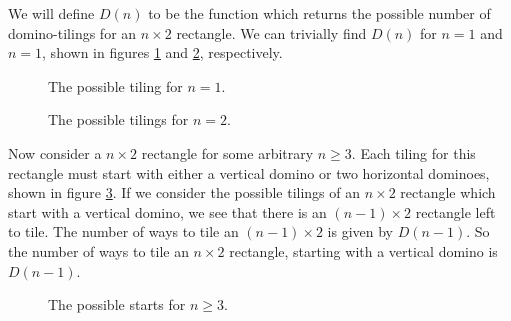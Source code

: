 \documentclass[12pt]{article}
\begin{document}
We will define $D(n)$ to be the function which returns the possible number of domino-tilings for an $n \times 2$ rectangle. We can trivially find $D(n)$ for $n=1$ and $n=1$, shown in figures \ref{fig:dom1} and \ref{fig:dom2}, respectively.

\begin{figure}[ht]
    \centering
    \caption{The possible tiling for $n=1$.}
    \label{fig:dom1}
\end{figure}

\begin{figure}[ht]
    \centering
    \caption{The possible tilings for $n=2$.}
    \label{fig:dom2}
\end{figure}

Now consider a $n\times 2$ rectangle for some arbitrary $n\geq 3$. Each tiling for this rectangle must start with either a vertical domino or two horizontal dominoes, shown in figure \ref{fig:domn}. If we consider the possible tilings of an $n\times 2$ rectangle which start with a vertical domino, we see that there is an $(n-1)\times 2$ rectangle left to tile. The number of ways to tile an $(n-1)\times 2$ is given by $D(n-1)$. So the number of ways to tile an $n\times 2$ rectangle, starting with a vertical domino is $D(n-1)$.

\begin{figure}[ht]
    \centering
    \caption{The possible starts for $n\geq 3$.}
    \label{fig:domn}
\end{figure}
\end{document}
